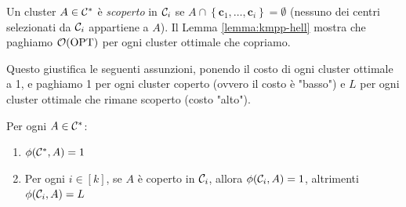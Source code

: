 Un cluster $A \in \mathcal{C}^\ast$ è \textit{scoperto} in $\mathcal{C}_i$ se $A \cap \left\{\bm c_1, \dots, \bm c_i\right\} = \emptyset$ (nessuno dei centri selezionati da $\mathcal{C}_i$ appartiene a $A$). Il Lemma \ref{lemma:kmpp-hell} mostra che paghiamo $\mathcal{O} (\textnormal{OPT})$ per ogni cluster ottimale che copriamo.

Questo giustifica le seguenti assunzioni, ponendo il costo di ogni cluster ottimale a 1, e paghiamo 1 per ogni cluster coperto  (ovvero il costo è "basso") e $L$ per ogni cluster ottimale che rimane scoperto (costo "alto"). \\

\begin{assumption}
    Per ogni $A \in \mathcal{C}^\ast$:
    \begin{enumerate}
        \item  $\phi (\mathcal{C}^\ast, A) = 1$

        \item Per ogni $i \in [k]$, se $A$ è coperto in $\mathcal{C}_i$, allora $\phi (\mathcal{C}_i, A) = 1$, altrimenti $\phi (\mathcal{C}_i, A) = L$ \\
    \end{enumerate}
\end{assumption}

